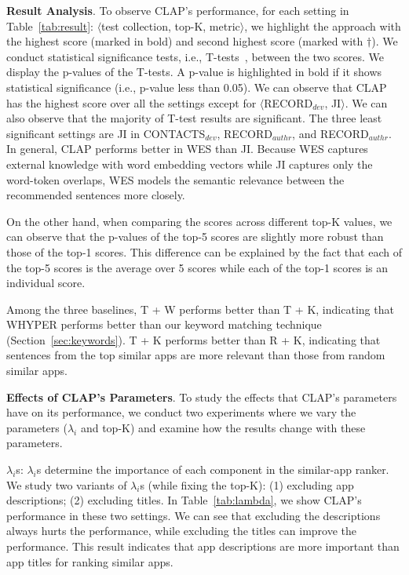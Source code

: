 {\bf Result Analysis}. 
To observe CLAP's performance, for each setting in Table~\ref{tab:result}: $\langle$test collection, top-K, metric$\rangle$, we highlight the approach with the highest score (marked in bold) and second highest score (marked with $\dagger$). 
We conduct statistical significance tests, i.e., T-tests~\cite{ttest}, between the two scores. 
We display the p-values of the T-tests. A p-value is highlighted in bold if it shows statistical significance (i.e., p-value less than 0.05). 
We can observe that CLAP has the highest score over all the settings except for $\langle$\textsf{RECORD}$_{dev}$, JI$\rangle$. 
We can also observe that the majority of T-test results are significant. 
The three least significant settings are JI in \textsf{CONTACTS}$_{dev}$, \textsf{RECORD}$_{authr}$, and \textsf{RECORD}$_{authr}$. 
In general, CLAP performs better in WES than JI. 
Because WES captures external knowledge with word embedding vectors while JI captures only the word-token overlaps, WES models the semantic relevance between the recommended sentences more closely. 

On the other hand, when comparing the scores across different top-K values, we can observe that the p-values of the top-5 scores are slightly more robust than those of the top-1 scores. 
This difference can be explained by the fact that each of the top-5 scores is the average over 5 scores while each of the top-1 scores is an individual score.

Among the three baselines, T + W performs better than T + K,  indicating that WHYPER performs better than our keyword matching technique (Section~\ref{sec:keywords}). T + K performs better than R + K, indicating that sentences from the top similar apps are more relevant than those from random similar apps. 

\textbf{Effects of CLAP's Parameters}. 
To study the effects that CLAP's parameters have on its performance, we conduct two experiments where we vary the parameters ($\lambda_i$ and top-K) and examine how the results change with these parameters. 

{$\lambda_i$s}: $\lambda_i$s determine the importance of each component in the similar-app ranker. We study two variants of $\lambda_i$s (while fixing the top-K): (1) excluding app descriptions; (2) excluding titles. 
In Table~\ref{tab:lambda}, we show CLAP's performance in these two settings.
 We can see that excluding the descriptions always hurts the performance, while excluding the titles can improve the performance. 
 This result indicates that app descriptions are more important than app titles for ranking similar apps.

